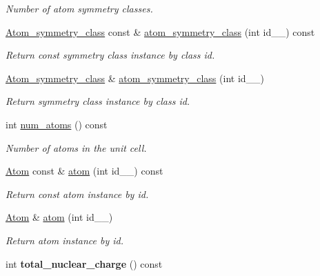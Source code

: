 \begin{DoxyCompactItemize}
\begin{DoxyCompactList}\small\item\em Number of atom symmetry classes. \end{DoxyCompactList}\item 
\hyperlink{classsirius_1_1_atom__symmetry__class}{Atom\+\_\+symmetry\+\_\+class} const \& \hyperlink{classsirius_1_1_unit__cell_ade4630721f7d72741777943dfc6ab8fe}{atom\+\_\+symmetry\+\_\+class} (int id\+\_\+\+\_\+) const 
\begin{DoxyCompactList}\small\item\em Return const symmetry class instance by class id. \end{DoxyCompactList}\item 
\hyperlink{classsirius_1_1_atom__symmetry__class}{Atom\+\_\+symmetry\+\_\+class} \& \hyperlink{classsirius_1_1_unit__cell_aa01128897145c1c846e64b68aa81e60d}{atom\+\_\+symmetry\+\_\+class} (int id\+\_\+\+\_\+)
\begin{DoxyCompactList}\small\item\em Return symmetry class instance by class id. \end{DoxyCompactList}\item 
int \hyperlink{classsirius_1_1_unit__cell_a1439a1d0fa7aa06fda4601581ae30a19}{num\+\_\+atoms} () const 
\begin{DoxyCompactList}\small\item\em Number of atoms in the unit cell. \end{DoxyCompactList}\item 
\hyperlink{classsirius_1_1_atom}{Atom} const \& \hyperlink{classsirius_1_1_unit__cell_ae0d938b64f0dc6ba19376a6db1968d20}{atom} (int id\+\_\+\+\_\+) const 
\begin{DoxyCompactList}\small\item\em Return const atom instance by id. \end{DoxyCompactList}\item 
\hyperlink{classsirius_1_1_atom}{Atom} \& \hyperlink{classsirius_1_1_unit__cell_a1789ffb7c2f0b695f264cb35bd850eec}{atom} (int id\+\_\+\+\_\+)
\begin{DoxyCompactList}\small\item\em Return atom instance by id. \end{DoxyCompactList}\item 
\hypertarget{classsirius_1_1_unit__cell_a1a6fb5979ec3f1dc7aae831ccacff591}{}int {\bfseries total\+\_\+nuclear\+\_\+charge} () const \label{classsirius_1_1_unit__cell_a1a6fb5979ec3f1dc7aae831ccacff591}


\end{DoxyCompactItemize}
